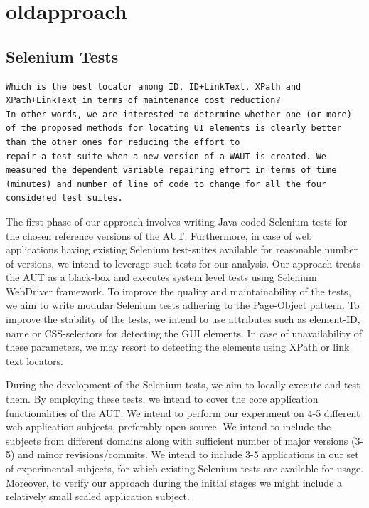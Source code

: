 \chapter{oldapproach} %

\label{Chapter3} %



\section{Selenium Tests}
\label{sec:WritingTests}
\begin{verbatim}
Which is the best locator among ID, ID+LinkText, XPath and XPath+LinkText in terms of maintenance cost reduction?
In other words, we are interested to determine whether one (or more) of the proposed methods for locating UI elements is clearly better than the other ones for reducing the effort to
repair a test suite when a new version of a WAUT is created. We measured the dependent variable repairing effort in terms of time (minutes) and number of line of code to change for all the four considered test suites.
\end{verbatim}
\vspace{-2mm} The first phase of our approach involves writing Java-coded Selenium tests for the chosen reference versions of the AUT. Furthermore, in case of web applications having existing Selenium test-suites available for reasonable number of versions, we intend to leverage such tests for our analysis. Our approach treats the AUT as a black-box and executes system level tests using Selenium WebDriver framework. To improve the quality and maintainability of the tests, we aim to write modular Selenium tests adhering to the Page-Object pattern. To improve the stability of the tests, we intend to use attributes such as element-ID, name or CSS-selectors for detecting the GUI elements. In case of unavailability of these parameters, we may resort to detecting the elements using XPath or link text locators. 

During the development of the Selenium tests, we aim to locally execute and test them.  By employing these tests, we intend to cover the core application functionalities of the AUT. We intend to perform our experiment on 4-5 different web application subjects, preferably open-source. We intend to include the subjects from different domains along with sufficient number of major versions (3-5) and minor revisions/commits. We intend to include 3-5 applications in our set of experimental subjects, for which existing Selenium tests are available for usage. Moreover, to verify our approach during the initial stages we might include a relatively small scaled application subject.

